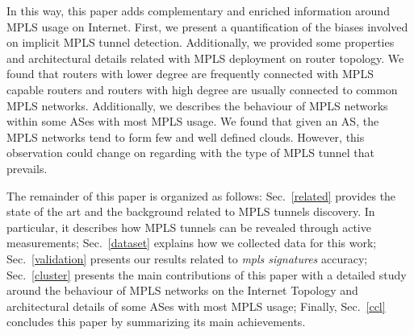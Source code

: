 In this way, this paper adds complementary and enriched information around MPLS usage on Internet. First, we present a quantification of the biases involved on implicit MPLS tunnel detection. Additionally, we provided some properties and architectural details related with MPLS deployment on router topology. We found that routers with lower degree are frequently connected with MPLS capable routers and routers with high degree are usually connected to common MPLS networks. Additionally, we describes the behaviour of MPLS networks within some ASes with most MPLS usage. We found that given an AS, the MPLS networks tend to form few and well defined clouds. However, this observation could change on regarding with the type of MPLS tunnel that prevails. 


The remainder of this paper is organized as follows: Sec.~\ref{related} provides
the state of the art and the background related to MPLS tunnels discovery. In
particular, it describes how MPLS tunnels can be revealed through active
measurements;  Sec.~\ref{dataset} explains how we collected data for this work;
Sec.~\ref{validation} presents our results related to \textit{mpls
signatures} accuracy; Sec.~\ref{cluster} presents the main
contributions of this paper with a detailed study around the behaviour of MPLS networks on the
Internet Topology and architectural details of some ASes with most MPLS usage; %
Finally, Sec.~\ref{ccl} concludes this paper by summarizing its main
achievements.

